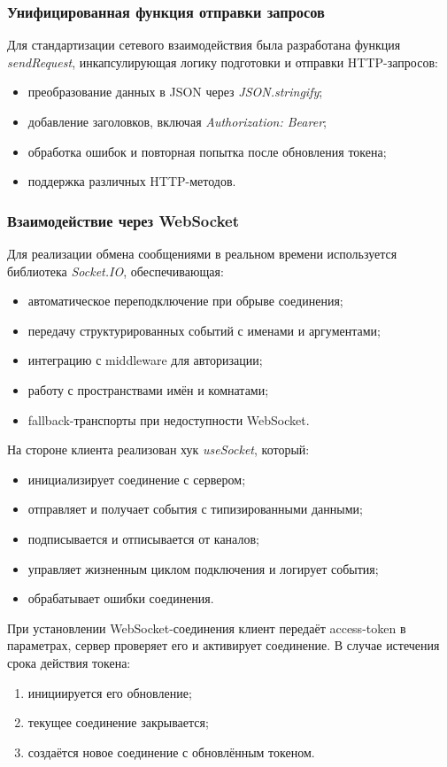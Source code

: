 \subsubsection{Унифицированная функция отправки запросов}
Для стандартизации сетевого взаимодействия была разработана функция \textit{sendRequest}, инкапсулирующая логику подготовки и отправки HTTP-запросов:
\begin{itemize}
  \item преобразование данных в JSON через \textit{JSON.stringify};
  \item добавление заголовков, включая \textit{Authorization: Bearer};
  \item обработка ошибок и повторная попытка после обновления токена;
  \item поддержка различных HTTP-методов.
\end{itemize}

\subsubsection{Взаимодействие через WebSocket}
Для реализации обмена сообщениями в реальном времени используется библиотека \textit{Socket.IO}, обеспечивающая:
\begin{itemize}
  \item автоматическое переподключение при обрыве соединения;
  \item передачу структурированных событий с именами и аргументами;
  \item интеграцию с middleware для авторизации;
  \item работу с пространствами имён и комнатами;
  \item fallback-транспорты при недоступности WebSocket.
\end{itemize}

На стороне клиента реализован хук \textit{useSocket}, который:
\begin{itemize}
  \item инициализирует соединение с сервером;
  \item отправляет и получает события с типизированными данными;
  \item подписывается и отписывается от каналов;
  \item управляет жизненным циклом подключения и логирует события;
  \item обрабатывает ошибки соединения.
\end{itemize}

При установлении WebSocket-соединения клиент передаёт access-token в параметрах, сервер проверяет его и активирует соединение. В случае истечения срока действия токена:
\begin{enumerate}
  \item инициируется его обновление;
  \item текущее соединение закрывается;
  \item создаётся новое соединение с обновлённым токеном.
\end{enumerate}

